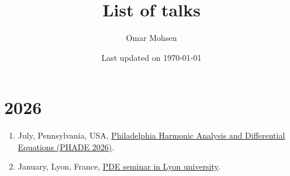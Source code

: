 \documentclass[a4paper, 13pt]{article}
\begin{document}
\title{List of talks}
\author{Omar Mohsen
}
\date{Last updated on \today}
\maketitle
\section*{2026}
\begin{enumerate}
  \item July, Pennsylvania, USA, \href{}{Philadelphia Harmonic Analysis and Differential Equations (PHADE 2026)}.
    \item     January, Lyon, France, \href{}{PDE seminar in Lyon university}.
\end{enumerate}
\end{document}
